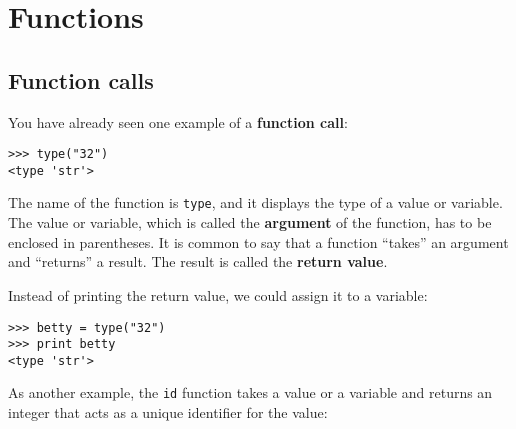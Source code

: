 


\chapter{Functions}
\label{floatchap}

\section{Function calls}
\label{functionchap}

You have already seen one example of a {\bf function call}:

\beforeverb
\begin{verbatim}
>>> type("32")
<type 'str'>
\end{verbatim}
\afterverb
%
The name of the function is {\tt type}, and it displays the type of
a value or variable.  The value or variable, which is called the
{\bf argument} of the function, has to be enclosed in parentheses.
It is common to say that a function ``takes'' an argument and ``returns''
a result.  The result is called the {\bf return value}.


Instead of printing the return value, we could assign it to a variable:

\beforeverb
\begin{verbatim}
>>> betty = type("32")
>>> print betty
<type 'str'>
\end{verbatim}
\afterverb
%
As another example, the {\tt id} function takes a value or a variable and
returns an integer that acts as a unique identifier for the value:

